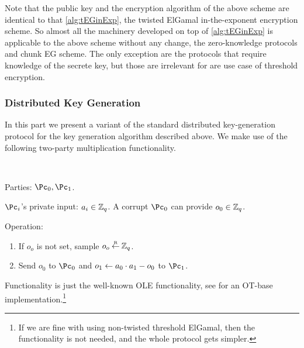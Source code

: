 Note that the public key and the encryption algorithm of the above scheme are identical to that \cref{alg:tEGinExp}, the twisted ElGamal in-the-exponent encryption scheme. So almost all the machinery  developed on top of \cref{alg:tEGinExp} is applicable to the above scheme without any change, \ie the zero-knowledge protocols and chunk EG scheme. The only exception are the protocols that require knowledge of the secrete key, but those are irrelevant for are use case of   threshold encryption.

\subsubsection{Distributed Key Generation}
In this part we present a variant of the standard distributed key-generation  protocol for the key generation algorithm \tdKg described above.  We make use of the following two-party multiplication   functionality.

\begin{functionality}\label{func:Mult}~
\item[Parties:] $\Pc_0,\Pc_1$.
\item[$\Pc_i$'s private input:] $a_i \in {\mathbb Z}_q$. A corrupt $\Pc_0$ can provide $o_0 \in {\mathbb Z}_q$.

\item[Operation:] ~
\begin{enumerate}
	\item If $o_o$ is not set, sample $o_o \mathbin{\stackrel{\mbox{\tiny R}}{\leftarrow}} {\mathbb Z}_q$.
	
	\item Send $o_0$ to $\Pc_0$ and $o_1 \leftarrow a_0 \cdot a_1 - o_0$ to $\Pc_1$.
\end{enumerate}
 
\end{functionality}
Functionality \Mult is just the well-known OLE functionality, see \cite{HaitnerMRT22} for an OT-base  implementation.\footnote{If we are fine with  using non-twisted threshold ElGamal, then the \Mult functionality is not needed, and the whole protocol gets simpler.}

